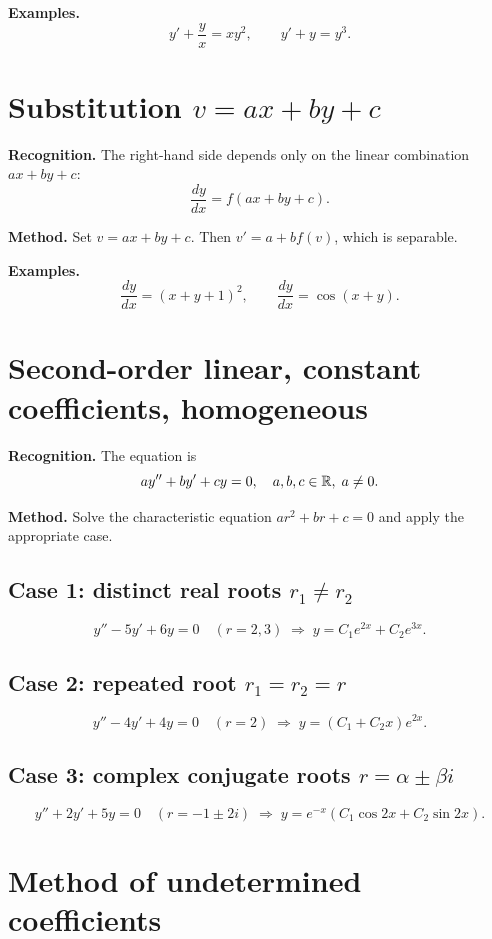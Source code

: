 \documentclass{essay}
\begin{document}
\textbf{Examples.}
\[
  y' + \frac{y}{x} = xy^2, \qquad y' + y = y^3.
\]

\section{Substitution $v = ax + by + c$}

\textbf{Recognition.}  The right-hand side depends only on the linear combination $ax+by+c$:
\[
  \frac{dy}{dx} = f(ax + by + c).
\]

\textbf{Method.}  Set $v = ax + by + c$.  Then $v' = a + b f(v)$, which is separable.

\textbf{Examples.}
\[
  \frac{dy}{dx} = (x + y + 1)^2, \qquad \frac{dy}{dx} = \cos(x+y).
\]

\section{Second-order linear, constant coefficients, homogeneous}

\textbf{Recognition.}  The equation is
\[
  ay'' + by' + cy = 0, \quad a,b,c \in \mathbb{R}, \; a \neq 0.
\]

\textbf{Method.}  Solve the characteristic equation $ar^2 + br + c = 0$ and apply the appropriate case.

\subsection*{Case 1: distinct real roots $r_1 \neq r_2$}
\[
  y'' - 5y' + 6y = 0 \quad (r = 2, 3)
  \;\Rightarrow\; y = C_1 e^{2x} + C_2 e^{3x}.
\]

\subsection*{Case 2: repeated root $r_1 = r_2 = r$}
\[
  y'' - 4y' + 4y = 0 \quad (r = 2)
  \;\Rightarrow\; y = (C_1 + C_2 x)e^{2x}.
\]

\subsection*{Case 3: complex conjugate roots $r = \alpha \pm \beta i$}
\[
  y'' + 2y' + 5y = 0 \quad (r = -1 \pm 2i)
  \;\Rightarrow\; y = e^{-x}(C_1\cos 2x + C_2 \sin 2x).
\]

\section{Method of undetermined coefficients}
\end{document}
